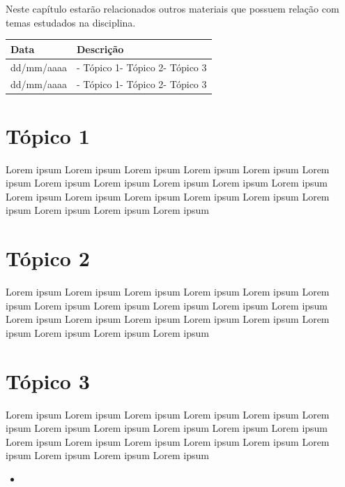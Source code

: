 \documentclass[
]{book}
\providecommand{\tightlist}{%
  \setlength{\itemsep}{0pt}\setlength{\parskip}{0pt}}
\begin{document}
Neste capítulo estarão relacionados outros materiais que possuem relação com temas estudados na disciplina.

\begin{longtable}[]{@{}ll@{}}
\toprule()
Data & Descrição \\
\midrule()
\endhead
dd/mm/aaaa & - Tópico 1- Tópico 2- Tópico 3 \\
dd/mm/aaaa & - Tópico 1- Tópico 2- Tópico 3 \\
\bottomrule()
\end{longtable}

\hypertarget{tuxf3pico-1}{%
\section{Tópico 1}\label{tuxf3pico-1}}

Lorem ipsum Lorem ipsum Lorem ipsum Lorem ipsum Lorem ipsum Lorem ipsum Lorem ipsum Lorem ipsum Lorem ipsum Lorem ipsum Lorem ipsum Lorem ipsum Lorem ipsum Lorem ipsum Lorem ipsum Lorem ipsum Lorem ipsum Lorem ipsum Lorem ipsum Lorem ipsum

\hypertarget{tuxf3pico-2}{%
\section{Tópico 2}\label{tuxf3pico-2}}

Lorem ipsum Lorem ipsum Lorem ipsum Lorem ipsum Lorem ipsum Lorem ipsum Lorem ipsum Lorem ipsum Lorem ipsum Lorem ipsum Lorem ipsum Lorem ipsum Lorem ipsum Lorem ipsum Lorem ipsum Lorem ipsum Lorem ipsum Lorem ipsum Lorem ipsum Lorem ipsum

\hypertarget{tuxf3pico-3}{%
\section{Tópico 3}\label{tuxf3pico-3}}

Lorem ipsum Lorem ipsum Lorem ipsum Lorem ipsum Lorem ipsum Lorem ipsum Lorem ipsum Lorem ipsum Lorem ipsum Lorem ipsum Lorem ipsum Lorem ipsum Lorem ipsum Lorem ipsum Lorem ipsum Lorem ipsum Lorem ipsum Lorem ipsum Lorem ipsum Lorem ipsum

\begin{itemize}
\tightlist
\item
\end{itemize}

  
\end{document}
